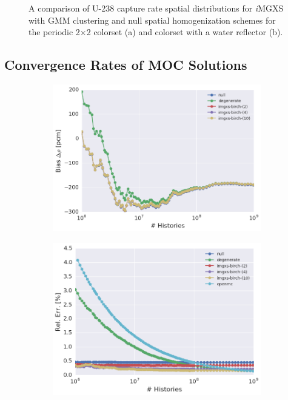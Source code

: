 \documentclass[12pt,twoside]{mitthesis-exec}
\begin{document}
\begin{figure}[h!]
\begin{subfigure}{0.49\textwidth}
  \caption{}
  \label{fig:refl-capt-rates-comp-2x2}
\end{subfigure}
\caption[U-238 capture rate comparison for the colorset]{A comparison of U-238 capture rate spatial distributions for \textit{i}MGXS with GMM clustering and null spatial homogenization schemes for the periodic 2$\times$2 colorset (a) and colorset with a water reflector (b).}
\label{fig:refl-capt-rates-comp}
\end{figure}

\clearpage

\subsection*{Convergence Rates of MOC Solutions}

\begin{figure}[h!]
\centering
\begin{subfigure}{\textwidth}
  \centering
  \includegraphics[width=0.8\linewidth]{figures/results/convergence/2x2/keff-bias-evo}
  \caption{}
  \label{fig:2x2-eigenvalue-converge}
\end{subfigure}
\begin{subfigure}{\textwidth}
  \centering
  \includegraphics[width=0.8\linewidth]{figures/results/convergence/2x2/mean-capt-err-evo}

\end{subfigure}
\end{figure}
\end{document}
